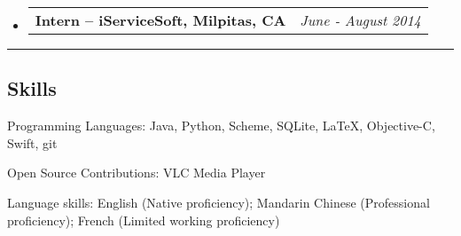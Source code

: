 \documentclass[10pt,letterpaper]{article}
\makeatletter
\newenvironment{indentsection}[1]%
{\begin{list}{}%
	{\setlength{\leftmargin}{#1}}%
	\item[]%
}
{\end{list}}
\newcommand{\headerrow}[2]
{\begin{tabular*}{\linewidth}{l@{\extracolsep{\fill}}r}
	#1 &
	#2 \\
\end{tabular*}}
\makeatother
\begin{document}
\begin{itemize}
	\item
	\headerrow
		{\textbf{Intern -- iServiceSoft, Milpitas, CA}}
		{\emph{June - August 2014}}

\end{itemize}

\hrule
\vspace{-0.4em}
\subsection*{Skills}

\begin{indentsection}{\parindent}
\begin{description*}
	\item[Programming Languages:]
	Java, Python, Scheme, SQLite, \LaTeX, Objective-C, Swift, git
	\item[Open Source Contributions:]
	VLC Media Player
	\item[Language skills:] English (Native proficiency); Mandarin Chinese (Professional proficiency); French (Limited working proficiency)
\end{description*}
\end{indentsection}
\end{document}
